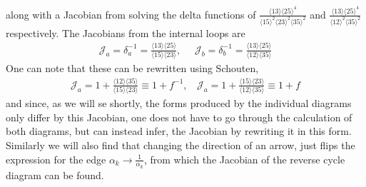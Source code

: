 \documentclass[letter,11pt]{article}
\newcommand{\J}{\mathcal{J}}
\newcommand{\ab}[1]{\langle #1 \rangle}
\begin{document}
along with a Jacobian from solving the delta functions of $\frac{\ab{13}\ab{25}^4}{\ab{15}^2\ab{23}^2\ab{35}^2}$ and $\frac{\ab{13}\ab{25}^4}{\ab{12}^2\ab{35}^2}$ respectively. The Jacobians from the internal loops are
\begin{equation}
	\begin{aligned}
		\J_a=\delta_a^{-1}=\frac{\ab{13}\ab{25}}{\ab{15}\ab{23}},~~~~~~\J_b=\delta_b^{-1}=\frac{\ab{13}\ab{25}}{\ab{12}\ab{35}}
	\end{aligned}
\end{equation}
One can note that these can be rewritten using Schouten,
\begin{equation}
	\begin{aligned}
		\J_a=1+\frac{\ab{12}\ab{35}}{\ab{15}\ab{23}}\equiv1+f^{-1},~~~~\J_a=1+\frac{\ab{15}\ab{23}}{\ab{12}\ab{35}}\equiv1+f
	\end{aligned}
\end{equation}
and since, as we will se shortly, the forms produced by the individual diagrams only differ by this Jacobian, one does not have to go through the calculation of both diagrams, but can instead infer, the Jacobian by rewriting it in this form. Similarly we will also find that changing the direction of an arrow, just flips the expression for the edge $\alpha_k\to\frac{1}{\alpha_k}$, from which the Jacobian of the reverse cycle diagram can be found.
\end{document}
